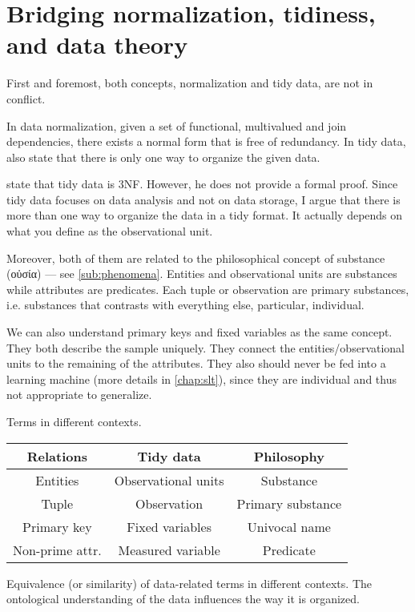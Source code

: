 \section{Bridging normalization, tidiness, and data theory}
\label{sub:bridge}

First and foremost, both concepts, normalization and tidy data, are not in conflict.

In data normalization, given a set of functional, multivalued and join dependencies, there
exists a normal form that is free of redundancy.  In tidy data,
\textcite{Wickham2023} also state that there is only one way to organize the given data.

\textcite{Wickham2014} state that tidy data is 3NF.  However, he does not provide a
formal proof.  Since tidy data focuses on data analysis and not on data storage, I argue
that there is more than one way to organize the data in a tidy format.  It actually
depends on what you define as the observational unit.

Moreover, both of them are related to the philosophical concept of substance (οὐσία) ---
see \cref{sub:phenomena}.
Entities and observational units are substances while attributes are predicates.
Each tuple or observation are primary substances, i.e. substances that contrasts with
everything else, particular, individual.

We can also understand primary keys and fixed variables as the same concept.  They both
describe the sample uniquely.  They connect the entities/observational
units to the remaining of the attributes.  They also should never be fed into a learning
machine (more details in \cref{chap:slt}), since they are individual and thus not
appropriate to generalize.

\begin{tablebox}[label=fig:bridge]{Terms in different contexts.}
  \centering
  \begin{tabular}{ccc}
    \toprule
    \textbf{Relations} & \textbf{Tidy data} & \textbf{Philosophy} \\
    \midrule
    Entities & Observational units & Substance \\
    Tuple & Observation & Primary substance \\
    Primary key & Fixed variables & Univocal name \\
    Non-prime attr. & Measured variable & Predicate \\
    \bottomrule
  \end{tabular}
  \tcblower
  Equivalence (or similarity) of data-related terms in different contexts.
  The ontological understanding of the data influences the way it is organized.
\end{tablebox}

